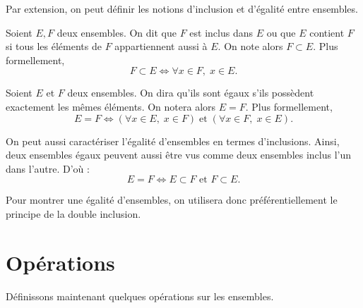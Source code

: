 Par extension, on peut définir les notions d'inclusion et d'égalité entre ensembles. 

\begin{definition}[Inclusion]
    Soient $E, F$ deux ensembles. On dit que $F$ est inclus dans $E$ ou que $E$ contient $F$ 
    si tous les éléments de $F$ appartiennent aussi à $E$. On note alors $F \subset E$. 
    Plus formellement, 
        \[ F \subset E \iff \forall x \in F, \; x \in E. \] 
\end{definition}

\begin{definition}[Égalité]
    Soient $E$ et $F$ deux ensembles. On dira qu'ils sont égaux s’ils possèdent 
    exactement les mêmes éléments. On notera alors $E = F$.
    Plus formellement, 
        \[ E = F \iff (\forall x \in E, \; x \in F) \; \text{et} \; (\forall x \in F, \; x \in E). \] 
\end{definition}

\begin{proposition}
    On peut aussi caractériser l'égalité d'ensembles en termes d'inclusions. 
    Ainsi, deux ensembles égaux peuvent aussi être vus comme deux ensembles inclus l'un dans l'autre. 
    D'où : 
        \[ E = F \iff E \subset F \text{ et } F \subset E. \]     
\end{proposition}

Pour montrer une égalité d'ensembles, on utilisera donc préférentiellement le principe de la 
double inclusion. 

\section{Opérations}

Définissons maintenant quelques opérations sur les ensembles. 

